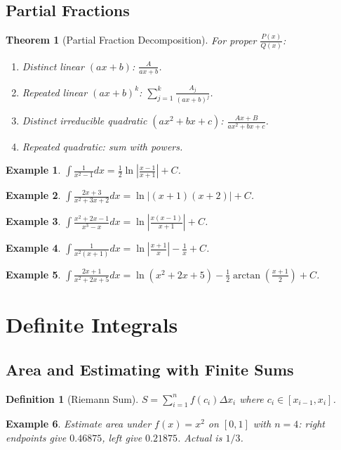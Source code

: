 \documentclass[11pt,a4paper]{article}
\newtheorem{example}{Example}
\newtheorem{theorem}{Theorem}
\newtheorem{definition}{Definition}
\begin{document}
\subsection{Partial Fractions}
\begin{theorem}[Partial Fraction Decomposition]
For proper $\frac{P(x)}{Q(x)}$:
\begin{enumerate}
\item Distinct linear $(ax+b)$: $\frac{A}{ax+b}$.
\item Repeated linear $(ax+b)^k$: $\sum_{j=1}^k \frac{A_j}{(ax+b)^j}$.
\item Distinct irreducible quadratic $(ax^2+bx+c)$: $\frac{Ax+B}{ax^2+bx+c}$.
\item Repeated quadratic: sum with powers.
\end{enumerate}
\end{theorem}
\begin{example}
$\int \frac{1}{x^2-1} dx = \frac{1}{2}\ln\left|\frac{x-1}{x+1}\right| + C$.
\end{example}
\begin{example}
$\int \frac{2x+3}{x^2+3x+2} dx = \ln|(x+1)(x+2)| + C$.
\end{example}
\begin{example}
$\int \frac{x^2+2x-1}{x^3-x} dx = \ln\left|\frac{x(x-1)}{x+1}\right| + C$.
\end{example}
\begin{example}
$\int \frac{1}{x^2(x+1)} dx = \ln\left|\frac{x+1}{x}\right| - \frac{1}{x} + C$.
\end{example}
\begin{example}
$\int \frac{2x+1}{x^2+2x+5} dx = \ln(x^2+2x+5) - \frac{1}{2}\arctan\left(\frac{x+1}{2}\right) + C$.
\end{example}
\section{Definite Integrals}
\subsection{Area and Estimating with Finite Sums}
\begin{definition}[Riemann Sum]
$S = \sum_{i=1}^n f(c_i) \Delta x_i$ where $c_i \in [x_{i-1}, x_i]$.
\end{definition}
\begin{example}
Estimate area under $f(x) = x^2$ on $[0,1]$ with $n=4$: right endpoints give $0.46875$, left give $0.21875$. Actual is $1/3$.
\end{example}
\end{document}
